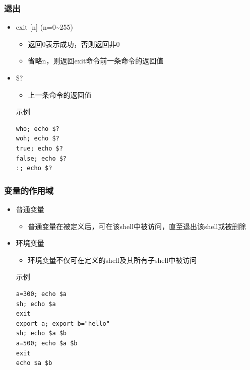 \documentclass[xcolor=svgnames,presentation]{beamer}
\begin{document}
\begin{frame}[fragile]
\frametitle{退出}
\label{sec-1-2-7}
\begin{itemize}

\item exit [n] (n=0\~{}255)
\label{sec-1-2-7-1}%
\begin{itemize}

\item 返回0表示成功，否则返回非0
\label{sec-1-2-7-1-1}%

\item 省略n，则返回exit命令前一条命令的返回值
\label{sec-1-2-7-1-2}%
\end{itemize} %

\item \$?
\label{sec-1-2-7-2}%
\begin{itemize}

\item 上一条命令的返回值
\label{sec-1-2-7-2-1}%
\end{itemize} %
\begin{exampleblock}{示例}
\label{sec-1-2-7-2-2}


\begin{verbatim}
who; echo $?
woh; echo $?
true; echo $?
false; echo $?
:; echo $?
\end{verbatim}
\end{exampleblock}
\end{itemize} %
\end{frame}
\begin{frame}[fragile]
\frametitle{变量的作用域}
\label{sec-1-2-8}
\begin{itemize}

\item 普通变量
\label{sec-1-2-8-1}%
\begin{itemize}

\item 普通变量在被定义后，可在该shell中被访问，直至退出该shell或被删除
\label{sec-1-2-8-1-1}%
\end{itemize} %

\item 环境变量
\label{sec-1-2-8-2}%
\begin{itemize}

\item 环境变量不仅可在定义的shell及其所有子shell中被访问
\label{sec-1-2-8-2-1}%
\end{itemize} %
\begin{exampleblock}{示例}
\label{sec-1-2-8-2-2}


\begin{verbatim}
a=300; echo $a
sh; echo $a
exit
export a; export b="hello"
sh; echo $a $b
a=500; echo $a $b
exit
echo $a $b
\end{verbatim}
\end{exampleblock}
\end{itemize} %
\end{frame}
\end{document}
